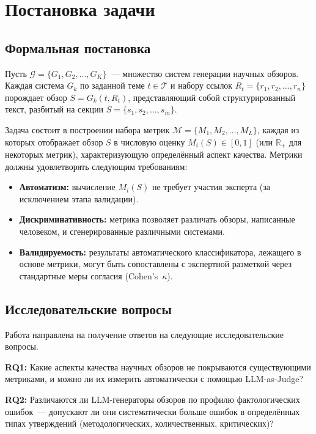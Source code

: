 \documentclass[a4paper,14pt]{extarticle}
\begin{document}
\section{Постановка задачи}

\subsection{Формальная постановка}

Пусть $\mathcal{G} = \{G_1, G_2, \ldots, G_K\}$~--- множество систем генерации научных обзоров. Каждая система $G_k$ по заданной теме $t \in \mathcal{T}$ и набору ссылок $R_t = \{r_1, r_2, \ldots, r_n\}$ порождает обзор $S = G_k(t, R_t)$, представляющий собой структурированный текст, разбитый на секции $S = \{s_1, s_2, \ldots, s_m\}$.

Задача состоит в построении набора метрик $\mathcal{M} = \{M_1, M_2, \ldots, M_L\}$, каждая из которых отображает обзор $S$ в числовую оценку $M_i(S) \in [0, 1]$ (или $\mathbb{R}_+$ для некоторых метрик), характеризующую определённый аспект качества. Метрики должны удовлетворять следующим требованиям:

\begin{itemize}
    \item \textbf{Автоматизм:} вычисление $M_i(S)$ не требует участия эксперта (за исключением этапа валидации).
    \item \textbf{Дискриминативность:} метрика позволяет различать обзоры, написанные человеком, и сгенерированные различными системами.
    \item \textbf{Валидируемость:} результаты автоматического классификатора, лежащего в основе метрики, могут быть сопоставлены с экспертной разметкой через стандартные меры согласия (Cohen's~$\kappa$).
\end{itemize}


\subsection{Исследовательские вопросы}

Работа направлена на получение ответов на следующие исследовательские вопросы.

\textbf{RQ1:} Какие аспекты качества научных обзоров не покрываются существующими метриками, и можно ли их измерить автоматически с помощью LLM-as-Judge?

\textbf{RQ2:} Различаются ли LLM-генераторы обзоров по профилю фактологических ошибок~--- допускают ли они систематически больше ошибок в определённых типах утверждений (методологических, количественных, критических)?
\end{document}
